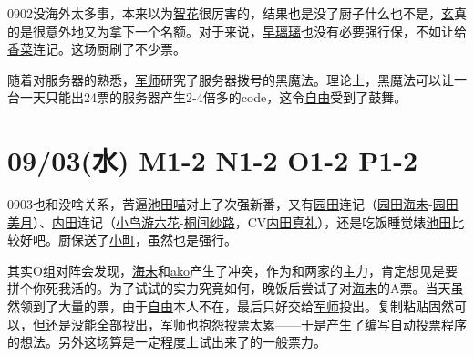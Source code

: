 0902没海外太多事，本来以为\uline{智花}很厉害的，结果也是没了厨子什么也不是，\uline{玄}真的是很意外地又为拿下一个名额。对于来说，\uline{早璃璃}也没有必要强行保，不如让给\uline{香菜}连记。这场厨刷了不少票。

随着对服务器的熟悉，\uline{军师}研究了服务器拨号的黑魔法。理论上，黑魔法可以让一台一天只能出24票的服务器产生2-4倍多的code，这令\uline{自由}受到了鼓舞。

\section{09/03(水) M1-2 N1-2 O1-2 P1-2}


0903也和没啥关系，苦逼\uline{池田喵}对上了次强新番，又有\uline{园田}连记（\uline{园田海未}-\uline{园田美月}）、\uline{内田}连记（\uline{小鸟游六花}-\uline{桐间纱路}，CV\uline{内田真礼}），还是吃饭睡觉婊\uline{池田}比较好吧。厨保送了\uline{小町}，虽然也是强行。

其实O组对阵会发现，\uline{海未}和\uline{ako}产生了冲突，作为和两家的主力，肯定想见是要拼个你死我活的。为了试试的实力究竟如何，晚饭后尝试了对\uline{海未}的A票。当天虽然领到了大量的票，由于\uline{自由}本人不在，最后只好交给\uline{军师}投出。复制粘贴固然可以，但还是没能全部投出，\uline{军师}也抱怨投票太累——于是产生了编写自动投票程序的想法。另外这场算是一定程度上试出来了的一般票力。

